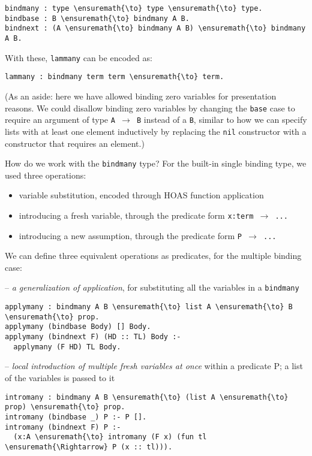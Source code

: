 \begin{verbatim}
bindmany : type \ensuremath{\to} type \ensuremath{\to} type.
bindbase : B \ensuremath{\to} bindmany A B.
bindnext : (A \ensuremath{\to} bindmany A B) \ensuremath{\to} bindmany A B.
\end{verbatim}

With these, \texttt{lammany} can be encoded as:

\begin{verbatim}
lammany : bindmany term term \ensuremath{\to} term.
\end{verbatim}

(As an aside: here we have allowed binding zero variables for
presentation reasons. We could disallow binding zero variables by
changing the \texttt{base} case to require an argument of type
\texttt{A\ \ensuremath{\to}\ B} instead of a \texttt{B}, similar to how
we can specify lists with at least one element inductively by replacing
the \texttt{nil} constructor with a constructor that requires an
element.)

How do we work with the \texttt{bindmany} type? For the built-in single
binding type, we used three operations:

\begin{itemize}
\tightlist
\item
  variable substitution, encoded through HOAS function application
\item
  introducing a fresh variable, through the predicate form
  \texttt{x:term\ \ensuremath{\to}\ ...}
\item
  introducing a new assumption, through the predicate form
  \texttt{P\ \ensuremath{\to}\ ...}
\end{itemize}

We can define three equivalent operations as predicates, for the
multiple binding case:

-- \emph{a generalization of application}, for substituting all the
variables in a \texttt{bindmany}

\begin{verbatim}
applymany : bindmany A B \ensuremath{\to} list A \ensuremath{\to} B \ensuremath{\to} prop.
applymany (bindbase Body) [] Body.
applymany (bindnext F) (HD :: TL) Body :-
  applymany (F HD) TL Body.
\end{verbatim}

-- \emph{local introduction of multiple fresh variables at once} within
a predicate P; a list of the variables is passed to it

\begin{verbatim}
intromany : bindmany A B \ensuremath{\to} (list A \ensuremath{\to} prop) \ensuremath{\to} prop.
intromany (bindbase _) P :- P [].
intromany (bindnext F) P :-
  (x:A \ensuremath{\to} intromany (F x) (fun tl \ensuremath{\Rightarrow} P (x :: tl))).
\end{verbatim}

